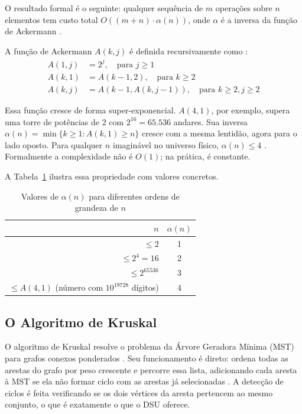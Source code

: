 \documentclass[12pt]{article}
\begin{document}
O resultado formal é o seguinte: qualquer sequência de $m$ operações sobre $n$ elementos tem custo total $O((m + n) \cdot \alpha(n))$, onde $\alpha$ é a inversa da função de Ackermann \cite{tarjan1975,tarjan1984}.

A função de Ackermann $A(k, j)$ é definida recursivamente como \cite{cormen2009}:
\begin{align}
A(1, j) &= 2^j, \quad \text{para } j \geq 1 \\
A(k, 1) &= A(k-1, 2), \quad \text{para } k \geq 2 \\
A(k, j) &= A(k-1, A(k, j-1)), \quad \text{para } k \geq 2, j \geq 2
\end{align}

Essa função cresce de forma super-exponencial. $A(4, 1)$, por exemplo, supera uma torre de potências de 2 com $2^{16} = 65.536$ andares. Sua inversa $\alpha(n) = \min\{k \geq 1 : A(k, 1) \geq n\}$ cresce com a mesma lentidão, agora para o lado oposto. Para qualquer $n$ imaginável no universo físico, $\alpha(n) \leq 4$ \cite{cormen2009}. Formalmente a complexidade não é $O(1)$; na prática, é constante.

A Tabela~\ref{tab:alpha} ilustra essa propriedade com valores concretos.

\begin{table}[!ht]
\centering
\caption{Valores de $\alpha(n)$ para diferentes ordens de grandeza de $n$}
\label{tab:alpha}
\begin{tabular}{|r|c|}
\hline
\textbf{$n$} & \textbf{$\alpha(n)$} \\
\hline
$\leq 2$ & 1 \\
$\leq 2^4 = 16$ & 2 \\
$\leq 2^{65536}$ & 3 \\
$\leq A(4,1)$ (número com $10^{19728}$ dígitos) & 4 \\
\hline
\end{tabular}
\end{table}

\subsection{O Algoritmo de Kruskal}

O algoritmo de Kruskal resolve o problema da Árvore Geradora Mínima (MST) para grafos conexos ponderados \cite{kruskal1956}. Seu funcionamento é direto: ordena todas as arestas do grafo por peso crescente e percorre essa lista, adicionando cada aresta à MST se ela não formar ciclo com as arestas já selecionadas \cite{sedgewick2011}. A detecção de ciclos é feita verificando se os dois vértices da aresta pertencem ao mesmo conjunto, o que é exatamente o que o DSU oferece.
\end{document}

